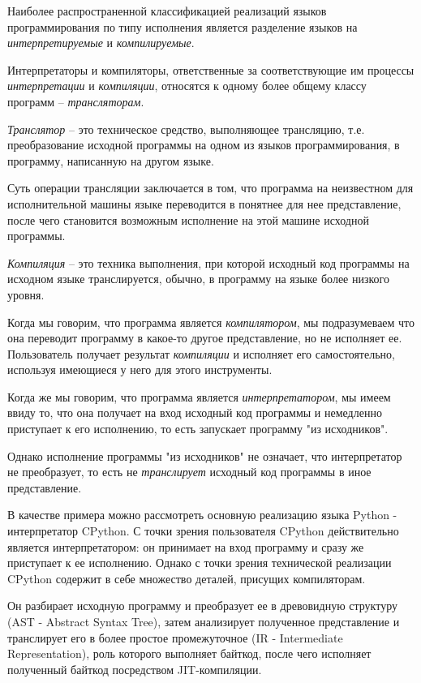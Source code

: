 
Наиболее распространенной классификацией реализаций языков
программирования по типу исполнения является
разделение языков на \emph{интерпретируемые} и \emph{компилируемые}.

Интерпретаторы и компиляторы, ответственные за соответствующие
им процессы \emph{интерпретации} и \emph{компиляции},
относятся к одному более общему классу программ -- \emph{трансляторам}.

\emph{Транслятор} -- это техническое средство, выполняющее трансляцию,
т.е. преобразование исходной программы на одном из языков программирования,
в программу, написанную на другом языке.

Суть операции трансляции заключается в том, что программа на неизвестном
для исполнительной машины языке переводится в понятнее для нее представление,
после чего становится возможным исполнение на этой машине исходной программы.

\emph{Компиляция} -- это техника выполнения, при которой 
исходный код программы на исходном языке транслируется,
обычно, в программу на языке более низкого уровня.

Когда мы говорим, что программа является \emph{компилятором},
мы подразумеваем что она переводит программу в какое-то
другое представление, но не исполняет ее. 
Пользователь получает результат \emph{компиляции}
и исполняет его самостоятельно, используя имеющиеся у него
для этого инструменты.

Когда же мы говорим, что программа является \emph{интерпретатором},
мы имеем ввиду то, что она получает на вход исходный код программы
и немедленно приступает к его исполнению, то есть 
запускает программу "из исходников".

Однако исполнение программы "из исходников" не означает,
что интерпретатор не преобразует, то есть не \emph{транслирует}
исходный код программы в иное представление.

В качестве примера можно рассмотреть основную реализацию языка
Python - интерпретатор CPython.
С точки зрения пользователя CPython действительно является
интерпретатором: он принимает на вход программу и сразу же
приступает к ее исполнению.
Однако с точки зрения технической реализации CPython содержит
в себе множество деталей, присущих компиляторам.

Он разбирает исходную программу и преобразует ее в древовидную
структуру (AST - Abstract Syntax Tree),
затем анализирует полученное представление и транслирует его 
в более простое промежуточное (IR - Intermediate Representation),
роль которого выполняет байткод,
после чего исполняет полученный байткод посредством JIT-компиляции.

